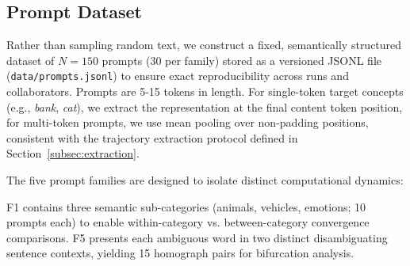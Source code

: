 \documentclass{article}
\begin{document}
\subsection{Prompt Dataset}
\label{subsec:prompts}

Rather than sampling random text, we construct a fixed, semantically structured dataset of $N = 150$ prompts (30 per family) stored as a versioned JSONL file (\texttt{data/prompts.jsonl}) to ensure exact reproducibility across runs and collaborators. Prompts are 5-15 tokens in length. For single-token target concepts (e.g., \textit{bank}, \textit{cat}), we extract the representation at the final content token position, for multi-token prompts, we use mean pooling over non-padding positions, consistent with the trajectory extraction protocol defined in Section~\ref{subsec:extraction}.

The five prompt families are designed to isolate distinct computational dynamics:

\begin{table}[htbp]
\centering
\caption{Prompt families, sizes, and primary geometric hypothesis.}
\label{tab:prompts}
\end{table}

F1 contains three semantic sub-categories (animals, vehicles, emotions; 10 prompts each) to enable within-category vs. between-category convergence comparisons. F5 presents each ambiguous word in two distinct disambiguating sentence contexts, yielding 15 homograph pairs for bifurcation analysis.
\end{document}
